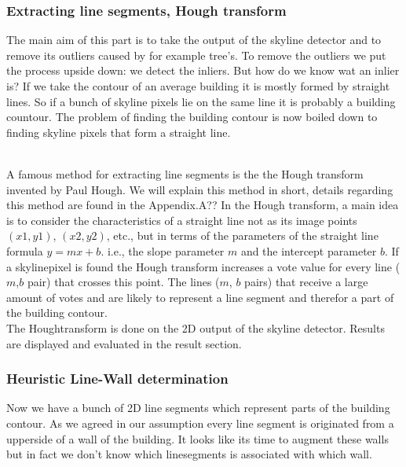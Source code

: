 \subsubsection{Extracting line segments, Hough transform} %

	The main aim of this part is to take the output of the skyline detector and to remove its outliers caused by for example tree's. To remove the outliers we put the process upside down: we detect the inliers.
	But how do we know wat an inlier is?
	If we take the contour of an average building it is mostly formed by straight lines.
	So if a bunch of skyline pixels lie on the same line it is probably a building countour.
	The problem of finding the building contour is now boiled down to finding skyline pixels that form a straight line.

	\\
	A famous method for extracting line segments is the the Hough transform invented by Paul Hough.
	We will explain this method in short, details regarding this method are found in the Appendix.A??%
	In the Hough transform, a main idea is to consider the characteristics of a straight line not as its image points $(x1, y1)$, $(x2, y2)$, etc., but in terms of the parameters of the straight line formula $y = mx + b$. i.e., the slope parameter $m$ and the intercept parameter $b$.
	If a skylinepixel is found the Hough transform increases a vote value for every line ($m$,$b$ pair) that crosses this point.
	The lines ($m$, $b$ pairs) that receive a large amount of votes and are likely to represent a line segment and therefor a part of the building contour.
	\\
	The Houghtransform is done on the 2D output of the skyline detector. Results are displayed and evaluated in the result section.

\subsubsection{Heuristic Line-Wall determination}
	Now we have a bunch of 2D line segments which represent parts of the building contour. 
	As we agreed in our assumption every line segment is originated from a upperside of a wall of the building.
	It looks like its time to augment these walls but in fact we don't know which linesegments is associated with which wall.

